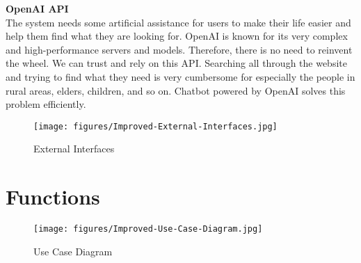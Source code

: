 \documentclass[listof=nochaptergap]{report}
\begin{document}
\textbf{OpenAI API} \\


The system needs some artificial assistance for users to make their life easier and help them find what they are looking for. OpenAI is known for its very complex and high-performance servers and models.  Therefore, there is no need to reinvent the wheel. We can trust and rely on this API. Searching all through the website and trying to find what they need is very cumbersome for especially the people in rural areas, elders, children, and so on. Chatbot powered by OpenAI solves this problem efficiently.

\begin{center}
            \begin{figure}[H]
                \centering
                \texttt{[image: figures/Improved-External-Interfaces.jpg]}
                \caption{External Interfaces} 
                \label{fig:figure1}
            \end{figure}
        \end{center}

\section{Functions}

\begin{center}
            \begin{figure}[H]
                \centering
                \texttt{[image: figures/Improved-Use-Case-Diagram.jpg]}
                \caption{Use Case Diagram} 
                \label{fig:figure1}
            \end{figure}
        \end{center}
\end{document}
